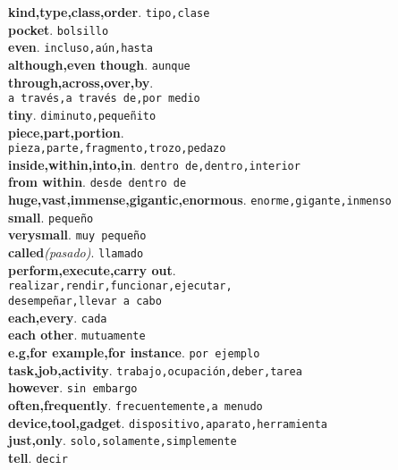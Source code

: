 \documentclass[twocolumn]{article}
\begin{document}
	\textsf{\textbf{kind,type,class,order}}. \texttt{tipo,clase}\\
	\textsf{\textbf{pocket}}. \texttt{bolsillo}\\
	\textsf{\textbf{even}}. \texttt{incluso,a\'un,hasta}\\
	\textsf{\textbf{although,even though}}. \texttt{aunque}\\ 
	\textsf{\textbf{through,across,over,by}}.\\\texttt{a trav\'es,a trav\'es de,por medio}\\  
	\textsf{\textbf{tiny}}. \texttt{diminuto,peque\~nito}\\ 
	\textsf{\textbf{piece,part,portion}}.\\\texttt{pieza,parte,fragmento,trozo,pedazo}\\
	\textsf{\textbf{inside,within,into,in}}. \texttt{dentro de,dentro,interior}\\
	\textsf{\textbf{from within}}. \texttt{desde dentro de}\\
	\textsf{\textbf{huge,vast,immense,gigantic,enormous}}. \texttt{enorme,gigante,inmenso}\\
	\textsf{\textbf{small}}. \texttt{peque\~no}\\
	\textsf{\textbf{verysmall}}. \texttt{muy peque\~no}\\
	\textsf{\textbf{called}{\scriptsize \textsl{(pasado)}}}. \texttt{llamado}\\
	\textsf{\textbf{perform,execute,carry out}}.\\\texttt{realizar,rendir,funcionar,ejecutar,\\desempe\~nar,llevar a cabo}\\
	\textsf{\textbf{each,every}}. \texttt{cada}\\
	\textsf{\textbf{each other}}. \texttt{mutuamente}\\
	\textsf{\textbf{e.g,for example,for instance}}. \texttt{por ejemplo}\\
	\textsf{\textbf{task,job,activity}}. \texttt{trabajo,ocupaci\'on,deber,tarea}\\
	\textsf{\textbf{however}}. \texttt{sin embargo}\\
	\textsf{\textbf{often,frequently}}. \texttt{frecuentemente,a menudo}\\
	\textsf{\textbf{device,tool,gadget}}. \texttt{dispositivo,aparato,herramienta}\\
	\textsf{\textbf{just,only}}. \texttt{solo,solamente,simplemente}\\
	\textsf{\textbf{tell}}. \texttt{decir}\\
\end{document}

